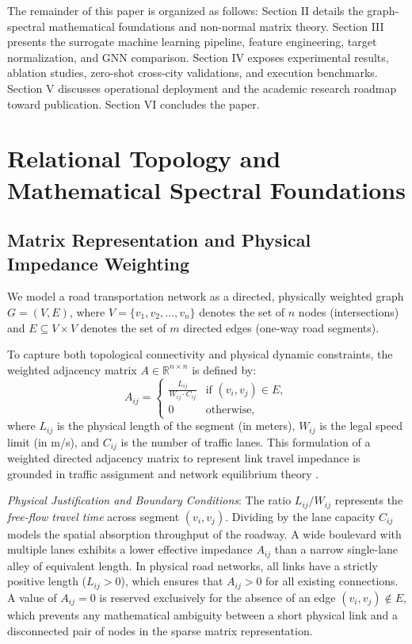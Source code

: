 \documentclass[lettersize,journal]{IEEEtran}
\begin{document}
The remainder of this paper is organized as follows: Section II details the graph-spectral mathematical foundations and non-normal matrix theory. Section III presents the surrogate machine learning pipeline, feature engineering, target normalization, and GNN comparison. Section IV exposes experimental results, ablation studies, zero-shot cross-city validations, and execution benchmarks. Section V discusses operational deployment and the academic research roadmap toward publication. Section VI concludes the paper.

\section{Relational Topology and Mathematical Spectral Foundations}

\subsection{Matrix Representation and Physical Impedance Weighting}
We model a road transportation network as a directed, physically weighted graph $G = (V, E)$, where $V = \{v_1, v_2, \dots, v_n\}$ denotes the set of $n$ nodes (intersections) and $E \subseteq V \times V$ denotes the set of $m$ directed edges (one-way road segments).

To capture both topological connectivity and physical dynamic constraints, the weighted adjacency matrix $A \in \mathbb{R}^{n \times n}$ is defined by:
\begin{equation}
A_{ij} = \begin{cases} 
\frac{L_{ij}}{W_{ij} \cdot C_{ij}} & \text{if } (v_i, v_j) \in E, \\ 
0 & \text{otherwise,} 
\end{cases}
\label{eq:adjacency}
\end{equation}
where $L_{ij}$ is the physical length of the segment (in meters), $W_{ij}$ is the legal speed limit (in m/s), and $C_{ij}$ is the number of traffic lanes. This formulation of a weighted directed adjacency matrix to represent link travel impedance is grounded in traffic assignment and network equilibrium theory \cite{Sheffi1985, Newman2010}.

\textit{Physical Justification and Boundary Conditions}: The ratio $L_{ij}/W_{ij}$ represents the \emph{free-flow travel time} across segment $(v_i, v_j)$. Dividing by the lane capacity $C_{ij}$ models the spatial absorption throughput of the roadway. A wide boulevard with multiple lanes exhibits a lower effective impedance $A_{ij}$ than a narrow single-lane alley of equivalent length. In physical road networks, all links have a strictly positive length ($L_{ij} > 0$), which ensures that $A_{ij} > 0$ for all existing connections. A value of $A_{ij} = 0$ is reserved exclusively for the absence of an edge $(v_i, v_j) \notin E$, which prevents any mathematical ambiguity between a short physical link and a disconnected pair of nodes in the sparse matrix representation.
\end{document}
